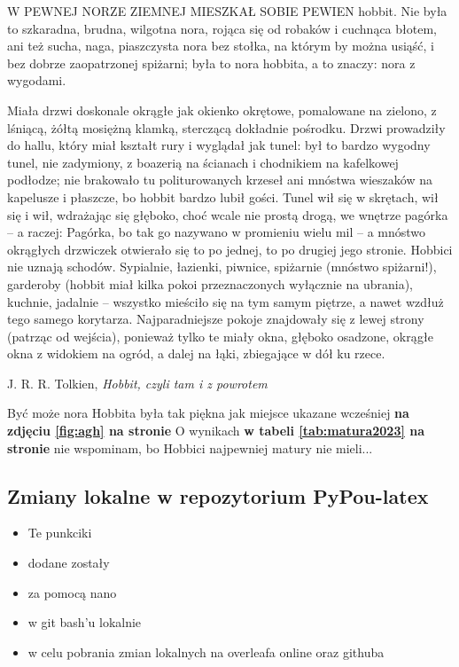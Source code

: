 \par
W PEWNEJ NORZE ZIEMNEJ MIESZKAŁ SOBIE PEWIEN hobbit. Nie była to szkaradna, brudna, wilgotna nora, rojąca się od robaków i cuchnąca błotem, ani też sucha, naga, piaszczysta nora bez stołka, na którym by można usiąść, i bez dobrze zaopatrzonej spiżarni; była to nora hobbita, a to znaczy: nora z wygodami.\par Miała drzwi doskonale okrągłe jak okienko okrętowe, pomalowane na zielono, z lśniącą, żółtą mosiężną klamką, sterczącą dokładnie pośrodku. Drzwi prowadziły do hallu, który miał kształt rury i wyglądał jak tunel: był to bardzo wygodny tunel, nie zadymiony, z boazerią na ścianach i chodnikiem na kafelkowej podłodze; nie brakowało tu politurowanych krzeseł ani mnóstwa wieszaków na kapelusze i płaszcze, bo hobbit bardzo lubił gości. Tunel wił się w skrętach, wił się i wił, wdrażając się głęboko, choć wcale nie prostą drogą, we wnętrze pagórka – a raczej: Pagórka, bo tak go nazywano w promieniu wielu mil – a mnóstwo okrągłych drzwiczek otwierało się to po jednej, to po drugiej jego stronie. Hobbici nie uznają schodów. Sypialnie, łazienki, piwnice, spiżarnie (mnóstwo spiżarni!), garderoby (hobbit miał kilka pokoi przeznaczonych wyłącznie na ubrania), kuchnie, jadalnie – wszystko mieściło się na tym samym piętrze, a nawet wzdłuż tego samego korytarza. Najparadniejsze pokoje znajdowały się z lewej strony (patrząc od wejścia), ponieważ tylko te miały okna, głęboko osadzone, okrągłe okna z widokiem na ogród, a dalej na łąki, zbiegające w dół ku rzece.\par
\begin{flushright}
J. R. R. Tolkien, \textit{Hobbit, czyli tam i z powrotem}
\end{flushright}
\par
\begingroup
    \centering
    Być może nora Hobbita była tak piękna jak miejsce ukazane wcześniej \textbf{na zdjęciu \ref{fig:agh} na stronie \pageref{fig:agh}} \Huge{\smiley{}} %
    \normalsize
    O wynikach \textbf{w tabeli \ref{tab:matura2023} na stronie \pageref{tab:matura2023}} nie wspominam, bo Hobbici najpewniej matury nie mieli... \Huge{\frownie{}}
\endgroup
\subsection{Zmiany lokalne w repozytorium PyPou-latex}
\begin{itemize}
	\item Te punkciki
	\item dodane zostały
	\item za pomocą nano
	\item w git bash'u lokalnie
	\item w celu pobrania zmian lokalnych na overleafa online oraz githuba 
\end{itemize}
\newpage
